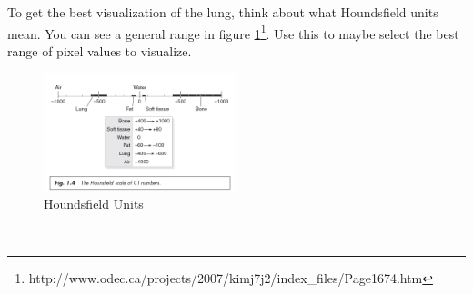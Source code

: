 \documentclass[10pt]{article}
\begin{document}
\indent To get the best visualization of the lung, think about what Houndsfield units mean.  You can see a general range in figure \ref{fig:HU}\footnote{http://www.odec.ca/projects/2007/kimj7j2/index\_files/Page1674.htm}.  Use this to maybe select the best range of pixel values to visualize.
\begin{figure}[h]
	\centering
	\includegraphics[width = 0.5\textwidth]{figures/houndsfield}
	\caption{Houndsfield Units}
	\label{fig:HU}
\end{figure}\\
\end{document}

